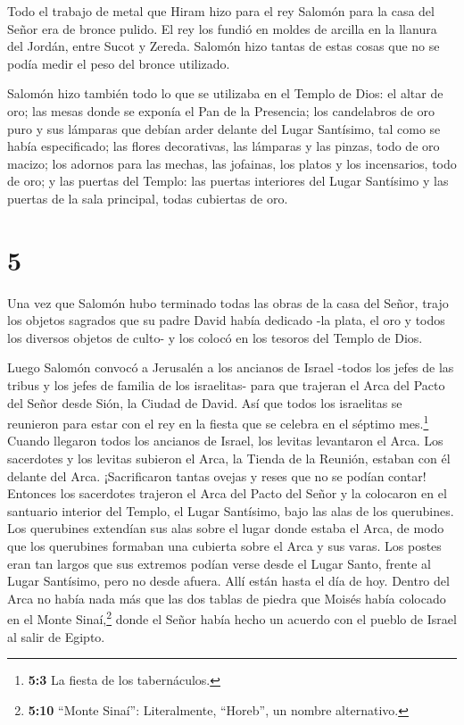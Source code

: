  Todo el trabajo de metal que Hiram hizo para el rey
Salomón para la casa del Señor era de bronce pulido.  El
rey los fundió en moldes de arcilla en la llanura del Jordán, entre
Sucot y Zereda.  Salomón hizo tantas de estas cosas que no
se podía medir el peso del bronce utilizado.

 Salomón hizo también todo lo que se utilizaba en el Templo
de Dios: el altar de oro; las mesas donde se exponía el Pan de la
Presencia;  los candelabros de oro puro y sus lámparas que
debían arder delante del Lugar Santísimo, tal como se había
especificado;  las flores decorativas, las lámparas y las
pinzas, todo de oro macizo;  los adornos para las mechas,
las jofainas, los platos y los incensarios, todo de oro; y las puertas
del Templo: las puertas interiores del Lugar Santísimo y las puertas de
la sala principal, todas cubiertas de oro.

\hypertarget{section-4}{%
\section{5}\label{section-4}}

 Una vez que Salomón hubo terminado todas las obras de la
casa del Señor, trajo los objetos sagrados que su padre David había
dedicado -la plata, el oro y todos los diversos objetos de culto- y los
colocó en los tesoros del Templo de Dios.

 Luego Salomón convocó a Jerusalén a los ancianos de Israel
-todos los jefes de las tribus y los jefes de familia de los israelitas-
para que trajeran el Arca del Pacto del Señor desde Sión, la Ciudad de
David.  Así que todos los israelitas se reunieron para estar
con el rey en la fiesta que se celebra en el séptimo mes.\footnote{\textbf{5:3}
  La fiesta de los tabernáculos.}  Cuando llegaron todos los
ancianos de Israel, los levitas levantaron el Arca.  Los
sacerdotes y los levitas subieron el Arca, la Tienda de la Reunión,
estaban con él delante del Arca.  ¡Sacrificaron tantas
ovejas y reses que no se podían contar!  Entonces los
sacerdotes trajeron el Arca del Pacto del Señor y la colocaron en el
santuario interior del Templo, el Lugar Santísimo, bajo las alas de los
querubines.  Los querubines extendían sus alas sobre el
lugar donde estaba el Arca, de modo que los querubines formaban una
cubierta sobre el Arca y sus varas.  Los postes eran tan
largos que sus extremos podían verse desde el Lugar Santo, frente al
Lugar Santísimo, pero no desde afuera. Allí están hasta el día de hoy.
 Dentro del Arca no había nada más que las dos tablas de
piedra que Moisés había colocado en el Monte Sinaí,\footnote{\textbf{5:10}
  ``Monte Sinaí'': Literalmente, ``Horeb'', un nombre alternativo.}
donde el Señor había hecho un acuerdo con el pueblo de Israel al salir
de Egipto.

